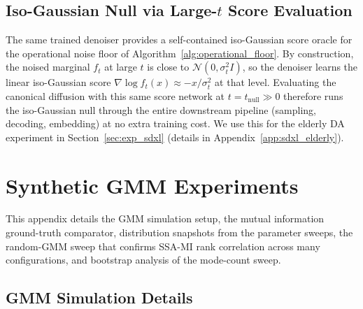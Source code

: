 \documentclass{article}
\begin{document}
\subsection{Iso-Gaussian Null via Large-$t$ Score Evaluation}
\label{app:tweedie_largeT}
The same trained denoiser provides a self-contained iso-Gaussian score
oracle for the operational noise floor of Algorithm~\ref{alg:operational_floor}.
By construction, the noised marginal $f_t$ at large $t$ is close to
$\mathcal{N}(0, \sigma_t^2 I)$, so the denoiser learns the linear iso-Gaussian
score $\nabla \log f_t(x) \approx -x/\sigma_t^2$ at that level. Evaluating
the canonical diffusion with this same score network at
$t = t_{\mathrm{null}} \gg 0$ therefore runs the iso-Gaussian null through
the entire downstream pipeline (sampling, decoding, embedding) at no extra
training cost. We use this for the elderly DA experiment in
Section~\ref{sec:exp_sdxl} (details in Appendix~\ref{app:sdxl_elderly}).


\section{Synthetic GMM Experiments}
\label{app:gmm_experiments}

This appendix details the GMM simulation setup, the mutual information ground-truth comparator, distribution snapshots from the parameter sweeps, the random-GMM sweep that confirms SSA-MI rank correlation across many configurations, and bootstrap analysis of the mode-count sweep.

\subsection{GMM Simulation Details}
\label{app:gmm_details}
\end{document}
